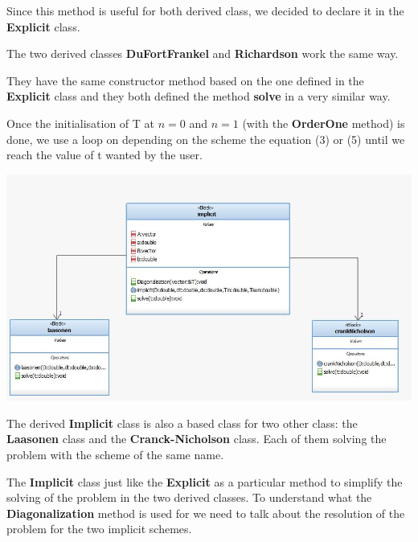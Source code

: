 \documentclass [10 pt, a4 paper]{article}
\begin{document}
Since this method is useful for both derived class, we decided to declare it in the 
\textbf{Explicit} class.

\vspace{0.3cm}

The two derived classes \textbf{DuFortFrankel} and \textbf{Richardson} work the same way.

They have the same constructor method based on the one defined in the \textbf{Explicit} class
and they both defined the method \textbf{solve} in a very similar way. 

Once the initialisation of T at $n = 0$ and $n = 1$ (with the \textbf{OrderOne} method) 
is done, we use a loop on depending on the scheme the equation (3) or (5) until we reach 
the value of t wanted by the user.

\begin{center} 
    \includegraphics[scale=0.6]{Implicit.JPG}
\end{center}

\vspace{0.3cm}

The derived \textbf{Implicit} class is also a based class for two other class: the 
\textbf{Laasonen} class and the \textbf{Cranck-Nicholson} class. Each of them solving 
the problem with the scheme of the same name.

The \textbf{Implicit} class just like the \textbf{Explicit} as a particular method to 
simplify the solving of the problem in the two derived classes. To understand what the 
\textbf{Diagonalization} method is used for we need to talk about
the resolution of the problem for the two implicit schemes.

\vspace{0.3cm}
\end{document}
